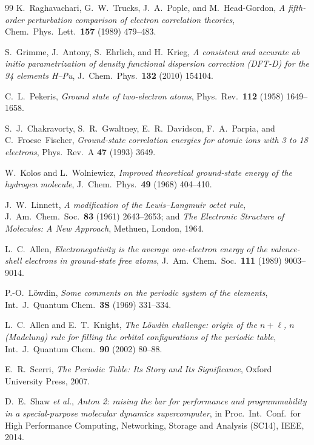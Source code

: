 \documentclass[11pt]{article}
\begin{document}
\begin{thebibliography}{99}
 K.~Raghavachari, G.~W.~Trucks, J.~A.~Pople, and M.~Head-Gordon,
  \emph{A fifth-order perturbation comparison of electron correlation theories},
  Chem.\ Phys.\ Lett.\ \textbf{157} (1989) 479--483.

 S.~Grimme, J.~Antony, S.~Ehrlich, and H.~Krieg, \emph{A consistent and
  accurate ab initio parametrization of density functional dispersion correction (DFT-D) for the
  94 elements H--Pu}, J.~Chem.\ Phys.\ \textbf{132} (2010) 154104.

 C.~L.~Pekeris, \emph{Ground state of two-electron atoms},
  Phys.\ Rev.\ \textbf{112} (1958) 1649--1658.

 S.~J.~Chakravorty, S.~R.~Gwaltney, E.~R.~Davidson, F.~A.~Parpia, and
  C.~Froese~Fischer, \emph{Ground-state correlation energies for atomic ions with 3 to 18
  electrons}, Phys.\ Rev.\ A \textbf{47} (1993) 3649.

 W.~Kolos and L.~Wolniewicz, \emph{Improved theoretical ground-state
  energy of the hydrogen molecule}, J.~Chem.\ Phys.\ \textbf{49} (1968) 404--410.

 J.~W.~Linnett, \emph{A modification of the Lewis--Langmuir octet rule},
  J.~Am.~Chem.~Soc.\ \textbf{83} (1961) 2643--2653; and \emph{The Electronic Structure of
  Molecules: A New Approach}, Methuen, London, 1964.

 L.~C.~Allen, \emph{Electronegativity is the average one-electron energy of
  the valence-shell electrons in ground-state free atoms}, J.~Am.~Chem.~Soc.\ \textbf{111} (1989)
  9003--9014.

 P.-O.~L\"owdin, \emph{Some comments on the periodic system of the elements},
  Int.\ J.\ Quantum Chem.\ \textbf{3S} (1969) 331--334.

 L.~C.~Allen and E.~T.~Knight, \emph{The L\"owdin challenge: origin of
  the $n+\ell$, $n$ (Madelung) rule for filling the orbital configurations of the periodic
  table}, Int.\ J.\ Quantum Chem.\ \textbf{90} (2002) 80--88.

 E.~R.~Scerri, \emph{The Periodic Table: Its Story and Its Significance},
  Oxford University Press, 2007.

 D.~E.~Shaw \emph{et al.}, \emph{Anton 2: raising the bar for performance and
  programmability in a special-purpose molecular dynamics supercomputer}, in Proc.\ Int.\ Conf.\
  for High Performance Computing, Networking, Storage and Analysis (SC14), IEEE, 2014.


\end{thebibliography}
\end{document}

